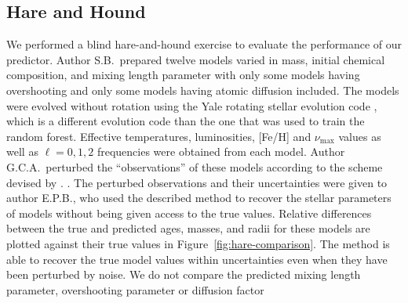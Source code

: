 \subsection{Hare and Hound} 
\label{sec:hnh}
We performed a blind hare-and-hound exercise to evaluate the performance of our predictor. Author S.B.\ prepared twelve models varied in mass, initial chemical composition, and mixing length parameter with only some models having overshooting and only some models having atomic diffusion included. The models were evolved without rotation using the Yale rotating stellar evolution code \citep[YREC;][]{2008ApSS.316...31D}, which is a different evolution code than the one that was used to train the random forest. Effective temperatures, luminosities, [Fe/H] and $\nu_{\max}$ values as well as ${\ell=0},1,2$ frequencies were obtained from each model. Author G.C.A.\  perturbed the ``observations'' of these models according to the scheme devised by \citet{spaceinn}. . The perturbed observations and their uncertainties were given to author E.P.B.\@, who used the described method to recover the stellar parameters of  models without being given access to the true values. Relative differences between the true and predicted ages, masses, and radii for these models are plotted against their true values in Figure~\ref{fig:hare-comparison}. The method is able to recover the true model values within uncertainties even when they have been perturbed by noise. We do not compare the predicted mixing length parameter, overshooting parameter or diffusion  factor %

